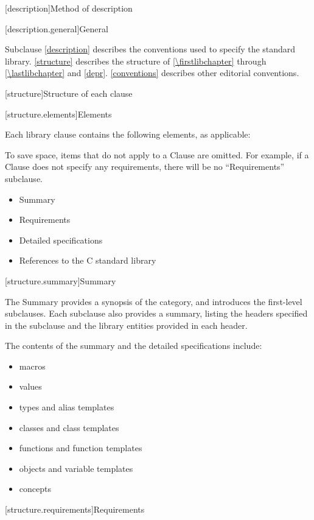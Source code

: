 [description]{Method of description}

[description.general]{General}

\pnum
Subclause \ref{description} describes the conventions used to specify the \Cpp{} standard
library. \ref{structure} describes the structure of
\ref{\firstlibchapter} through \ref{\lastlibchapter} and
\ref{depr}. \ref{conventions} describes other editorial conventions.

[structure]{Structure of each clause}

[structure.elements]{Elements}

\pnum
Each library clause contains the following elements, as applicable:
\begin{footnote}
To
save space, items that do not apply to a Clause are omitted.
For example, if a Clause does not specify any requirements,
there will be no ``Requirements'' subclause.
\end{footnote}

\begin{itemize}
\item Summary
\item Requirements
\item Detailed specifications
\item References to the C standard library
\end{itemize}

[structure.summary]{Summary}

\pnum
The Summary provides a synopsis of the category, and introduces the first-level subclauses.
Each subclause also provides a summary, listing the headers specified in the
subclause and the library entities provided in each header.

\pnum
The contents of the summary and the detailed specifications include:

\begin{itemize}
\item macros
\item values
\item types and alias templates
\item classes and class templates
\item functions and function templates
\item objects and variable templates
\item concepts
\end{itemize}

[structure.requirements]{Requirements}


